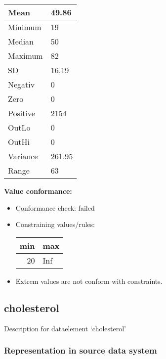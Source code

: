 \documentclass[
]{article}
\providecommand{\tightlist}{%
  \setlength{\itemsep}{0pt}\setlength{\parskip}{0pt}}
\begin{document}
\begin{table}[H]
\centering
\begin{tabular}{l|l}
\hline
Mean & 49.86\\
\hline
Minimum & 19\\
\hline
Median & 50\\
\hline
Maximum & 82\\
\hline
SD & 16.19\\
\hline
Negativ & 0\\
\hline
Zero & 0\\
\hline
Positive & 2154\\
\hline
OutLo & 0\\
\hline
OutHi & 0\\
\hline
Variance & 261.95\\
\hline
Range & 63\\
\hline
\end{tabular}
\end{table}

\textbf{Value conformance:}

\begin{itemize}
\tightlist
\item
  Conformance check: failed
\item
  Constraining values/rules:

  \begin{table}[H]
  \centering
  \begin{tabular}{r|l}
  \hline
  \textbf{min} & \textbf{max}\\
  \hline
  20 & Inf\\
  \hline
  \end{tabular}
  \end{table}
\item
  Extrem values are not conform with constraints.
\end{itemize}

\newpage

\hypertarget{cholesterol}{%
\subsection{cholesterol}\label{cholesterol}}

Description for dataelement `cholesterol'

\hypertarget{representation-in-source-data-system-1}{%
\subsubsection{\texorpdfstring{Representation in \textbf{source} data
system}{Representation in source data system}}\label{representation-in-source-data-system-1}}
\end{document}
